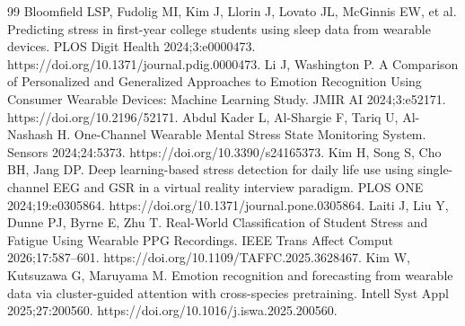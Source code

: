\documentclass[11pt,a4paper]{article}
\begin{document}
\begin{thebibliography}{99}
 Bloomfield LSP, Fudolig MI, Kim J, Llorin J, Lovato JL, McGinnis EW, et al. Predicting stress in first-year college students using sleep data from wearable devices. PLOS Digit Health 2024;3:e0000473. https://doi.org/10.1371/journal.pdig.0000473.
 Li J, Washington P. A Comparison of Personalized and Generalized Approaches to Emotion Recognition Using Consumer Wearable Devices: Machine Learning Study. JMIR AI 2024;3:e52171. https://doi.org/10.2196/52171.
 Abdul Kader L, Al-Shargie F, Tariq U, Al-Nashash H. One-Channel Wearable Mental Stress State Monitoring System. Sensors 2024;24:5373. https://doi.org/10.3390/s24165373.
 Kim H, Song S, Cho BH, Jang DP. Deep learning-based stress detection for daily life use using single-channel EEG and GSR in a virtual reality interview paradigm. PLOS ONE 2024;19:e0305864. https://doi.org/10.1371/journal.pone.0305864.
 Laiti J, Liu Y, Dunne PJ, Byrne E, Zhu T. Real-World Classification of Student Stress and Fatigue Using Wearable PPG Recordings. IEEE Trans Affect Comput 2026;17:587--601. https://doi.org/10.1109/TAFFC.2025.3628467.
 Kim W, Kutsuzawa G, Maruyama M. Emotion recognition and forecasting from wearable data via cluster-guided attention with cross-species pretraining. Intell Syst Appl 2025;27:200560. https://doi.org/10.1016/j.iswa.2025.200560.
\end{thebibliography}
\end{document}
